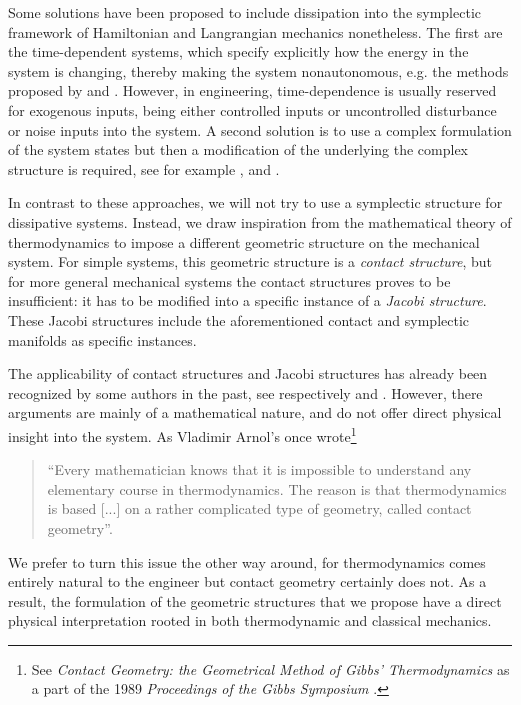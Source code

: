 Some solutions have been proposed to include dissipation into the symplectic framework of Hamiltonian and Langrangian mechanics nonetheless. The first are the time-dependent systems, which specify explicitly how the energy in the system is changing, thereby making the system nonautonomous, e.g. the methods proposed by \citet{Caldirola1941} and \citet{Kanai1948}. However, in engineering, time-dependence is usually reserved for exogenous inputs, being either controlled inputs or uncontrolled disturbance or noise inputs into the system. A second solution is to use a complex formulation of the system states but then a modification of the underlying the complex structure is required, see for example \citet{Hutters2020}, \citet{Dedene1980} and \citet{Rajeev2007}.

In contrast to these approaches, we will not try to use a symplectic structure for dissipative systems. Instead, we draw inspiration from the mathematical theory of thermodynamics to impose a different geometric structure on the mechanical system. For simple systems, this geometric structure is a \emph{contact structure}, but for more general mechanical systems the contact structures proves to be insufficient: it has to be modified into a specific instance of a \emph{Jacobi structure}. These Jacobi structures include the aforementioned contact and symplectic manifolds as specific instances.

The applicability of contact structures and Jacobi structures has already been recognized by some authors in the past, see respectively \citet{Bravetti2017} and \citet{ciaglia2018}. However, there arguments are mainly of a mathematical nature, and do not offer direct physical insight into the system. As Vladimir Arnol's once wrote\footnote{See \emph{Contact Geometry: the Geometrical Method of Gibbs' Thermodynamics} as a part of the 1989 \emph{Proceedings of the Gibbs Symposium} \cite[p. 163]{Arnold1989b}.}
\begin{quote}
``Every mathematician knows that it is impossible to understand any elementary course in thermodynamics. The reason is that thermodynamics is based [...] on a rather complicated type of geometry, called contact geometry''.
\end{quote}
We prefer to turn this issue the other way around, for thermodynamics comes entirely natural to the engineer but contact geometry certainly does not. As a result, the formulation of the geometric structures that we propose have a direct physical interpretation rooted in both thermodynamic and classical mechanics.

